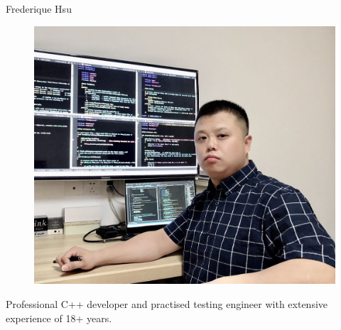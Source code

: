 \documentclass[./CV]{subfiles}
\begin{document}
    \begin{center}
        {\Huge{Frederique Hsu}}
    \end{center}
    
    \begin{figure}[th]
        \centering
        \includegraphics[width=1\columnwidth]{Portrait.jpg}\\[-0.5em]
    \end{figure}
        Professional C++ developer and practised testing engineer with extensive experience of 18+ years.
        \\[-0.2cm]
\end{document}
